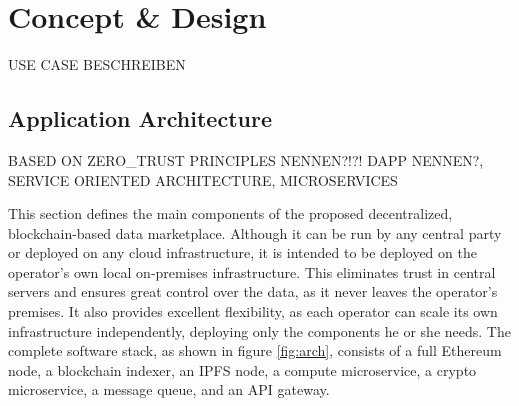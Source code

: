 \chapter{Concept \& Design}
\label{cha:cod}

USE CASE BESCHREIBEN

\section{Application Architecture}
\label{section:software_architecture}

BASED ON ZERO_TRUST PRINCIPLES NENNEN?!?! DAPP NENNEN?, SERVICE ORIENTED ARCHITECTURE, MICROSERVICES

This section defines the main components of the proposed decentralized, blockchain-based data marketplace. Although it can be run by any central party or deployed on any cloud infrastructure, it is intended to be deployed on the operator's own local on-premises infrastructure. This eliminates trust in central servers and ensures great control over the data, as it never leaves the operator's premises. It also provides excellent flexibility, as each operator can scale its own infrastructure independently, deploying only the components he or she needs. The complete software stack, as shown in figure \ref{fig:arch}, consists of a full Ethereum node, a blockchain indexer, an IPFS node, a compute microservice, a crypto microservice, a message queue, and an API gateway.


        
